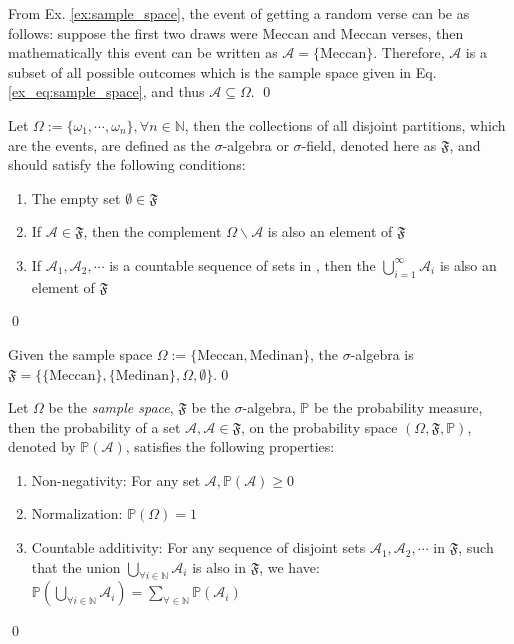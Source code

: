 \begin{exmpx}
From Ex. \ref{ex:sample_space}, the event of getting a random verse can be as follows: suppose the first two draws were Meccan and Meccan verses, then mathematically this event can be written as $\mathscr{A}=\{\text{Meccan}\}$. Therefore, $\mathscr{A}$ is a subset of all possible outcomes which is the sample space given in Eq. \ref{ex_eq:sample_space}, and thus $\mathscr{A}\subseteq{\Omega}$. \qed
\end{exmpx}
\begin{defnx}\label{defn:sigma_algebra}
Let $\Omega:=\{\omega_1,\cdots,\omega_n\}, \forall n\in\mathbb{N}$, then the collections of all disjoint partitions, which are the events, are defined as the $\sigma$-algebra or $\sigma$-field, denoted here as $\mathfrak{F}$, and should satisfy the following conditions:
\begin{enumerate}
    \item The empty set $\emptyset\in\mathfrak{F}$
    \item If $\mathscr{A}\in\mathfrak{F}$, then the complement $\Omega\backslash\mathscr{A}$ is also an element of $\mathfrak{F}$
    \item If $\mathscr{A}_1,\mathscr{A}_2,\cdots$ is a countable sequence of sets in , then the $\bigcup_{i=1}^{\infty}\mathscr{A}_i$ is also an element of $\mathfrak{F}$
\end{enumerate}\qed
\end{defnx}
\begin{exmpx}
Given the sample space $\Omega:=\{\text{Meccan},\text{Medinan}\}$, the $\sigma$-algebra is $\mathfrak{F}=\{\{\text{Meccan}\},\{\text{Medinan}\},\Omega,\emptyset\}$.\qed
\end{exmpx}
\begin{defnx}\label{defn:probability_measure}
Let $\Omega$ be the \textit{sample space}, $\mathfrak{F}$ be the $\sigma$-algebra, $\mathbb{P}$ be the probability measure, then the probability of a set $\mathscr{A}, \mathscr{A}\in\mathfrak{F}$, on the probability space $(\Omega,\mathfrak{F},\mathbb{P})$, denoted by $\mathbb{P}(\mathscr{A})$, satisfies the following properties:
\begin{enumerate}
    \item Non-negativity: For any set $\mathscr{A}, \mathbb{P}(\mathscr{A})\geq 0$
    \item Normalization: $\mathbb{P}(\Omega)=1$
    \item Countable additivity: For any sequence of disjoint sets $\mathscr{A}_1,\mathscr{A}_2,\cdots$ in $\mathfrak{F}$, such that the union $\bigcup_{\forall i \in\mathbb{N}}\mathscr{A}_i$ is also in $\mathfrak{F}$, we have: $\mathbb{P}\left(\displaystyle\bigcup_{\forall i\in\mathbb{N}}\mathscr{A}_i\right)=\displaystyle\sum_{\forall \in\mathbb{N}}\mathbb{P}(\mathscr{A}_i)$
\end{enumerate}
\qed
\end{defnx}

